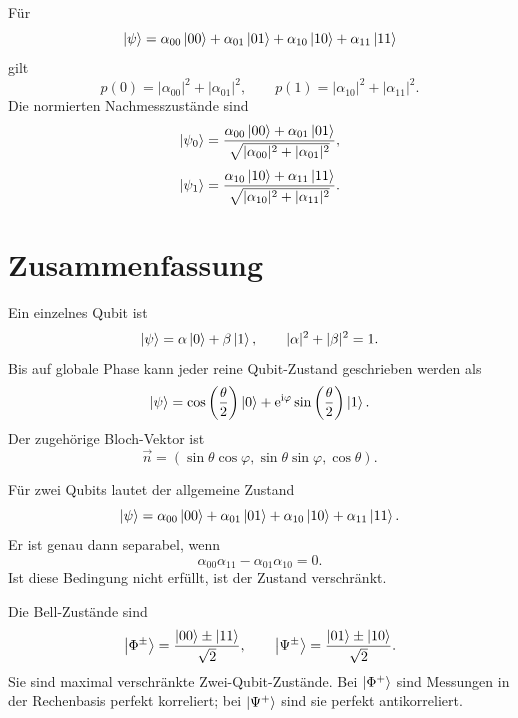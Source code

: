 Für
\[
    \left|\psi\right\rangle
    =\alpha_{00}\left|00\right\rangle+\alpha_{01}\left|01\right\rangle
    +\alpha_{10}\left|10\right\rangle+\alpha_{11}\left|11\right\rangle
\]
gilt
\[
    p(0)=|\alpha_{00}|^2+|\alpha_{01}|^2,
    \qquad
    p(1)=|\alpha_{10}|^2+|\alpha_{11}|^2.
\]
Die normierten Nachmesszustände sind
\[
    \left|\psi_0\right\rangle
    =\frac{\alpha_{00}\left|00\right\rangle+\alpha_{01}\left|01\right\rangle}{
    \sqrt{|\alpha_{00}|^2+|\alpha_{01}|^2}},
\]
\[
    \left|\psi_1\right\rangle
    =\frac{\alpha_{10}\left|10\right\rangle+\alpha_{11}\left|11\right\rangle}{
    \sqrt{|\alpha_{10}|^2+|\alpha_{11}|^2}}.
\]

\section{Zusammenfassung}

\begin{formulabox}
Ein einzelnes Qubit ist
\[
    \left|\psi\right\rangle=\alpha\left|0\right\rangle+\beta\left|1\right\rangle,
    \qquad
    |\alpha|^2+|\beta|^2=1.
\]
Bis auf globale Phase kann jeder reine Qubit-Zustand geschrieben werden als
\[
    \left|\psi\right\rangle
    =\cos\left(\frac{\theta}{2}\right)\left|0\right\rangle
    +\mathrm{e}^{\mathrm{i}\varphi}\sin\left(\frac{\theta}{2}\right)\left|1\right\rangle.
\]
Der zugehörige Bloch-Vektor ist
\[
    \vec n=(\sin\theta\cos\varphi,\sin\theta\sin\varphi,\cos\theta).
\]
\end{formulabox}

\begin{formulabox}
Für zwei Qubits lautet der allgemeine Zustand
\[
    \left|\psi\right\rangle
    =\alpha_{00}\left|00\right\rangle+\alpha_{01}\left|01\right\rangle
    +\alpha_{10}\left|10\right\rangle+\alpha_{11}\left|11\right\rangle.
\]
Er ist genau dann separabel, wenn
\[
    \alpha_{00}\alpha_{11}-\alpha_{01}\alpha_{10}=0.
\]
Ist diese Bedingung nicht erfüllt, ist der Zustand verschränkt.
\end{formulabox}

\begin{formulabox}
Die Bell-Zustände sind
\[
    \left|\Phi^\pm\right\rangle=\frac{\left|00\right\rangle\pm\left|11\right\rangle}{\sqrt2},
    \qquad
    \left|\Psi^\pm\right\rangle=\frac{\left|01\right\rangle\pm\left|10\right\rangle}{\sqrt2}.
\]
Sie sind maximal verschränkte Zwei-Qubit-Zustände. Bei \(\left|\Phi^+\right\rangle\) sind Messungen in der Rechenbasis perfekt korreliert; bei \(\left|\Psi^+\right\rangle\) sind sie perfekt antikorreliert.
\end{formulabox}

